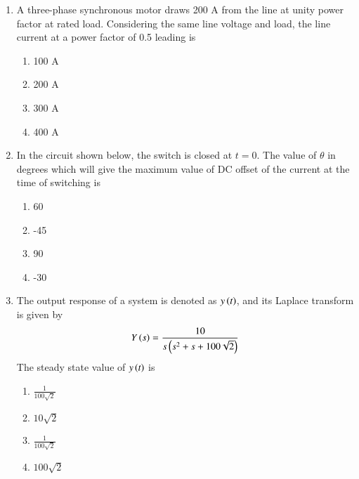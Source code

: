 \documentclass[journal]{IEEEtran}
\begin{document}
\begin{enumerate}
    \item A three-phase synchronous motor draws 200 A from the line at unity power factor
    at rated load. Considering the same line voltage and load, the line current at a power
    factor of 0.5 leading is
    \begin{multicols}{4}
    \begin{enumerate}
        \item 100 A
        \item 200 A
        \item 300 A
        \item 400 A
    \end{enumerate}
    \end{multicols}
    
    \item In the circuit shown below, the switch is closed at $t=0$. The value of $\theta$
    in degrees which will give the maximum value of DC offset of the current at the time of switching is
    
    
    
    \begin{multicols}{4}
    \begin{enumerate}
        \item 60
        \item -45
        \item 90
        \item -30
    \end{enumerate}
    \end{multicols}

    \item The output response of a system is denoted as $y\left(t\right)$, and its Laplace transform is given by
    \begin{align*}
    Y\left(s\right) = \frac{10}{s\left(s^2 + s + 100\sqrt{2}\right)}
    \end{align*}
    The steady state value of $y\left(t\right)$ is
    \begin{multicols}{4}
    \begin{enumerate}
        \item $\frac{1}{100\sqrt{2}}$
        \item $10\sqrt{2}$
        \item $\frac{1}{100\sqrt{2}}$
        \item $100\sqrt{2}$
    \end{enumerate}
    \end{multicols}


\end{enumerate}
\end{document}
